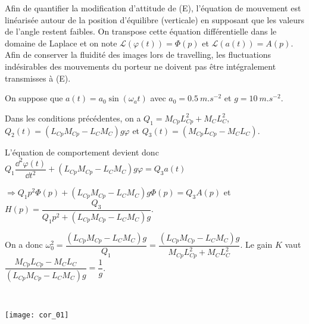  
\ifprof
\else
Afin de quantifier la modification d’attitude de (E), l'équation de mouvement est linéarisée autour de la position
d'équilibre (verticale) en supposant que les valeurs de l'angle restent faibles. On transpose cette équation
différentielle dans le domaine de Laplace et on note $\mathcal{L}\left(\varphi(t) \right)=\Phi(p)$ et $\mathcal{L}\left(a(t) \right)=A(p)$. 
Afin de conserver la fluidité des images lors de travelling, les fluctuations indésirables des mouvements du porteur ne
doivent pas être intégralement transmisses à (E).

On suppose que $a(t)=a_0\sin \left( \omega_a t\right)$ avec $a_0=\SI{0,5}{m.s^{-2}}$ et $g=\SI{10}{m.s^{-2}}$.
\fi

\ifprof
\begin{corrige}
Dans les conditions précédentes, on a $Q_1 = M_{Cp}L_{Cp}^2+M_{C}L_{C}^2 $, $Q_2(t)=\left(   L_{Cp}M_{Cp} - L_CM_C \right)g  \varphi$ et $Q_3(t)=  \left(M_{Cp}L_{Cp}- M_CL_C\right)$.

L'équation de comportement devient donc  $Q_1\dfrac{\dd^2\varphi(t) }{\dd t^2}+\left(   L_{Cp}M_{Cp} - L_CM_C \right)g  \varphi=Q_3a(t)$ 

$ \Rightarrow Q_1 p^2 \Phi(p) + \left(   L_{Cp}M_{Cp} - L_CM_C \right)g  \Phi(p)=Q_3A(p)$ et $H(p)=\dfrac{Q_3}{ Q_1 p^2  + \left(   L_{Cp}M_{Cp} - L_CM_C \right)g  }$.

On a donc $\omega_0^2 = \dfrac{\left(   L_{Cp}M_{Cp} - L_CM_C \right)g }{Q_1}=\dfrac{\left(   L_{Cp}M_{Cp} - L_CM_C \right)g }{ M_{Cp}L_{Cp}^2+M_{C}L_{C}^2}$. 
Le gain $K$ vaut $\dfrac{M_{Cp}L_{Cp}- M_CL_C}{\left(   L_{Cp}M_{Cp} - L_CM_C \right)g}=\dfrac{1}{g}$.
\end{corrige}
\else
\fi

\ifprof
\begin{corrige}~\\

\begin{center}
\texttt{[image: cor\_01]}
\end{center}
\end{corrige}
\else
\fi


